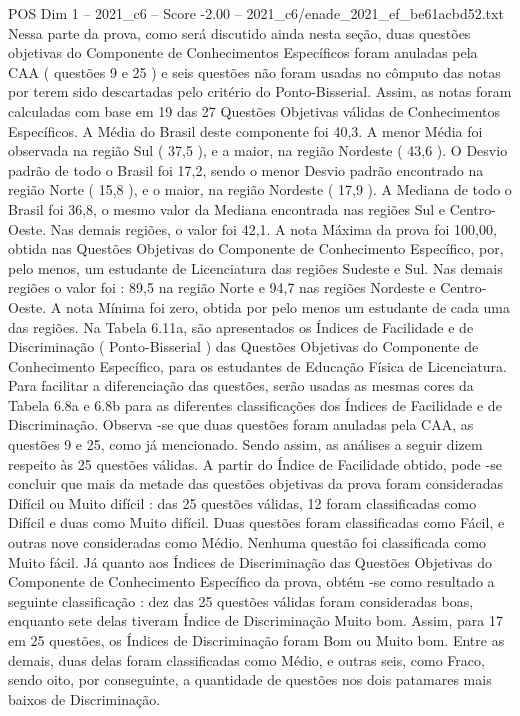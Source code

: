 \begin{textsample}{POS Dim 1 – 2021\_c6 – Score -2.00 – 2021\_c6/enade\_2021\_ef\_be61acbd52.txt}
Nessa parte da prova, como será discutido ainda nesta seção, duas questões objetivas do Componente de Conhecimentos Específicos foram anuladas pela CAA ( questões 9 e 25 ) e seis questões não foram usadas no cômputo das notas por terem sido descartadas pelo critério do Ponto-Bisserial.
Assim, as notas foram calculadas com base em 19 das 27 Questões Objetivas válidas de Conhecimentos Específicos.
A Média do Brasil deste componente foi 40,3.
A menor Média foi observada na região Sul ( 37,5 ), e a maior, na região Nordeste ( 43,6 ).
O Desvio padrão de todo o Brasil foi 17,2, sendo o menor Desvio padrão encontrado na região Norte ( 15,8 ), e o maior, na região Nordeste ( 17,9 ).
A Mediana de todo o Brasil foi 36,8, o mesmo valor da Mediana encontrada nas regiões Sul e Centro-Oeste.
Nas demais regiões, o valor foi 42,1.
A nota Máxima da prova foi 100,00, obtida nas Questões Objetivas do Componente de Conhecimento Específico, por, pelo menos, um estudante de Licenciatura das regiões Sudeste e Sul.
Nas demais regiões o valor foi : 89,5 na região Norte e 94,7 nas regiões Nordeste e Centro-Oeste.
A nota Mínima foi zero, obtida por pelo menos um estudante de cada uma das regiões.
Na Tabela 6.11a, são apresentados os Índices de Facilidade e de Discriminação ( Ponto-Bisserial ) das Questões Objetivas do Componente de Conhecimento Específico, para os estudantes de Educação Física de Licenciatura.
Para facilitar a diferenciação das questões, serão usadas as mesmas cores da Tabela 6.8a e 6.8b para as diferentes classificações dos Índices de Facilidade e de Discriminação.
Observa -se que duas questões foram anuladas pela CAA, as questões 9 e 25, como já mencionado.
Sendo assim, as análises a seguir dizem respeito às 25 questões válidas.
A partir do Índice de Facilidade obtido, pode -se concluir que mais da metade das questões objetivas da prova foram consideradas Difícil ou Muito difícil : das 25 questões válidas, 12 foram classificadas como Difícil e duas como Muito difícil.
Duas questões foram classificadas como Fácil, e outras nove consideradas como Médio.
Nenhuma questão foi classificada como Muito fácil.
Já quanto aos Índices de Discriminação das Questões Objetivas do Componente de Conhecimento Específico da prova, obtém -se como resultado a seguinte classificação : dez das 25 questões válidas foram consideradas boas, enquanto sete delas tiveram Índice de Discriminação Muito bom.
Assim, para 17 em 25 questões, os Índices de Discriminação foram Bom ou Muito bom.
Entre as demais, duas delas foram classificadas como Médio, e outras seis, como Fraco, sendo oito, por conseguinte, a quantidade de questões nos dois patamares mais baixos de Discriminação.

\end{textsample}

